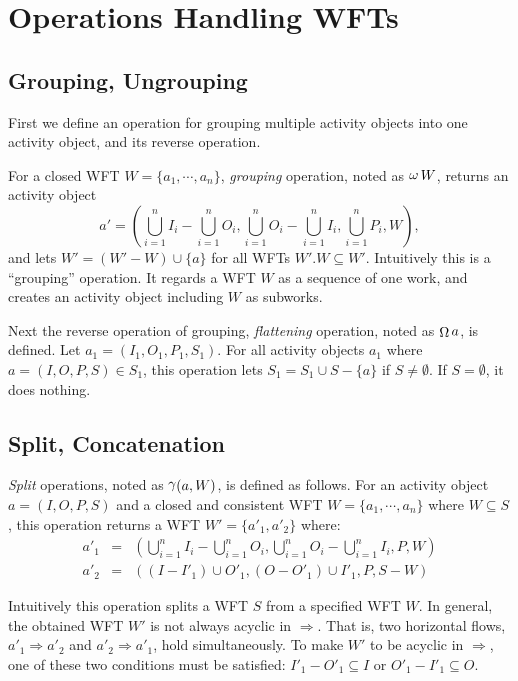 \section{Operations Handling WFTs}
\label{sec:changewfop}


\subsection{Grouping, Ungrouping}

First we define an operation for grouping multiple activity objects into 
one activity object, and its reverse operation.

For a closed WFT $W = \{a_1, \cdots, a_n\}$, {\em grouping} operation,
noted as $\mathop{\omega} W$, returns an activity object
\[
 a' = (\bigcup^n_{i=1}I_i-\bigcup^n_{i=1}O_i,
 \bigcup^n_{i=1}O_i-\bigcup^n_{i=1}I_i, \bigcup^n_{i=1}P_i, W), 
\]
and lets $W' = (W' - W) \cup \{a\}$ for all WFTs $W'. W \subseteq W'$.
Intuitively this is a ``grouping'' operation.  It regards a WFT
$W$ as a sequence of one work, and creates an activity object
including $W$ as subworks.

Next the reverse operation of grouping, {\em flattening} operation,
noted as $\mathop{\Omega} a$, is defined.
Let $a_1 = (I_1, O_1, P_1, S_1)$.  For all activity objects $a_1$ where
$a = (I, O, P, S) \in S_1$, this operation lets $S_1 = S_1 \cup S -
\{a\}$ if $S \neq \emptyset$.  If $S = \emptyset$, it does nothing.

\subsection{Split, Concatenation}
{\em Split} operations, noted as $\mathop{\gamma}(a, W)$, is defined as
follows.  For an activity object $a = (I, O, P, S)$ and a closed and
consistent WFT $W = \{a_1, \cdots, a_n\}$ where $W \subseteq S$, this
operation returns a WFT $W' = \{a'_1, a'_2\}$ where:
\begin{eqnarray*}
 a'_1 & = & (\bigcup^n_{i=1}I_i-\bigcup^n_{i=1}O_i,
  \bigcup^n_{i=1}O_i-\bigcup^n_{i=1}I_i, P, W)\\
 a'_2 & = & ((I - I'_1) \cup O'_1, (O - O'_1) \cup I'_1, P, S-W)
\end{eqnarray*}

Intuitively this operation splits a WFT $S$ from a specified WFT $W$.
In general, the obtained WFT $W'$ is not always acyclic in
$\Longrightarrow$.  That is, two horizontal flows, $a'_1 \Longrightarrow
a'_2$ and $a'_2 \Longrightarrow a'_1$, hold simultaneously.  To make
$W'$ to be acyclic in $\Longrightarrow$, one of these two conditions
must be satisfied: $I'_1 - O'_1 \subseteq I$ or $O'_1 - I'_1 \subseteq
O$.

